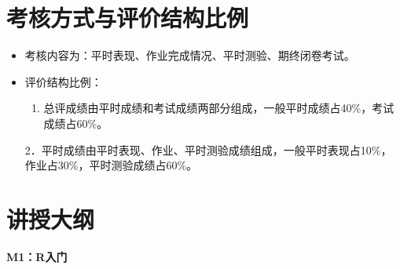 \documentclass[12pt,hyperref,]{ctexart}
\providecommand{\tightlist}{%
  \setlength{\itemsep}{0pt}\setlength{\parskip}{0pt}}
\begin{document}
\section{考核方式与评价结构比例}

\begin{itemize}
\item
  考核内容为：平时表现、作业完成情况、平时测验、期终闭卷考试。
\item
  评价结构比例：

  \begin{enumerate}
  \def\labelenumi{\arabic{enumi}.}
  \tightlist
  \item
    总评成绩由平时成绩和考试成绩两部分组成，一般平时成绩占40\%，考试成绩占60\%。
  \end{enumerate}

  2．平时成绩由平时表现、作业、平时测验成绩组成，一般平时表现占10\%，作业占30\%，平时测验成绩占60\%。
\end{itemize}

\section{讲授大纲}

\textbf{M1：R入门}
\end{document}
